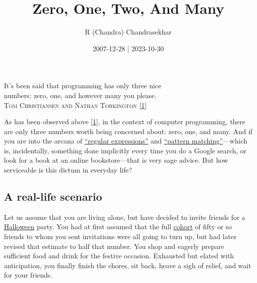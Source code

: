 \documentclass[
  a4paper,
]{article}
\title{Zero, One, Two, And Many}
\author{R (Chandra) Chandrasekhar}
\date{2007-12-28 | 2023-10-30}
\begin{document}
\maketitle

\thispagestyle{empty}


\begin{flushright}

\begin{footnotesize}

It's been said that programming has only three nice\\
numbers: zero, one, and however many you please.\\
\textsc{Tom Christiansen and Nathan Torkington}
{[}\protect\hyperlink{ref-perlcookbook2003}{1}{]}

\end{footnotesize}

\end{flushright}

\hfill\break
As has been observed above
{[}\protect\hyperlink{ref-perlcookbook2003}{1}{]}, in the context of
computer programming, there are only three numbers worth being concerned
about: zero, one, and many. And if you are into the arcana of
\href{https://developer.mozilla.org/en-US/docs/Web/JavaScript/Guide/Regular_expressions}{``regular
expressions''} and
\href{https://www.google.com/search?q=pattern+matching}{``pattern
matching''}---which is, incidentally, something done implicitly every
time you do a Google search, or look for a book at an online
bookstore---that is very sage advice. But how serviceable is this dictum
in everyday life?

\hypertarget{a-real-life-scenario}{%
\subsection{A real-life scenario}\label{a-real-life-scenario}}

Let us assume that you are living alone, but have decided to invite
friends for a
\href{https://www.britannica.com/topic/Halloween}{Halloween} party. You
had at first assumed that the full
\href{https://www.vocabulary.com/dictionary/cohort}{cohort} of fifty or
so friends to whom you sent invitations were all going to turn up, but
had later revised that estimate to half that number. You shop and
eagerly prepare sufficient food and drink for the festive occasion.
Exhausted but elated with anticipation, you finally finish the chores,
sit back, heave a sigh of relief, and wait for your friends.
\end{document}
